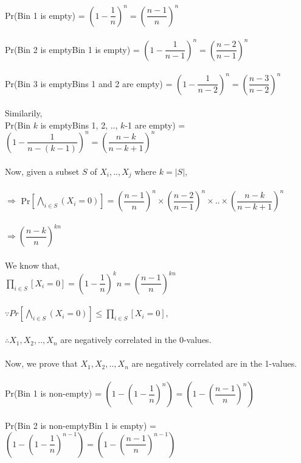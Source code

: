 \documentclass{article}
\begin{document}
Pr(Bin 1 is empty) = $\left(1-\dfrac{1}{n}\right)^n = \left(\dfrac{n-1}{n}\right)^n$\\
\\
Pr(Bin 2 is empty\textbar Bin 1 is empty) = $\left(1-\dfrac{1}{n-1}\right)^n = \left(\dfrac{n-2}{n-1}\right)^n$\\
\\
Pr(Bin 3 is empty\textbar Bins 1 and 2 are empty) = $\left(1-\dfrac{1}{n-2}\right)^n = \left(\dfrac{n-3}{n-2}\right)^n$\\
\\
Similarily,\\
Pr(Bin $k$ is empty\textbar Bins 1, 2, .., $k$-1 are empty) = $\left(1-\dfrac{1}{n-(k-1)}\right)^n = \left(\dfrac{n-k}{n-k+1}\right)^n$\\
\\
Now, given a subset $S$ of $X_{i}, .., X_{j}$ where $k = |S|$, \\
\\$\Rightarrow$ Pr$\left[\bigwedge\limits_{i \in S}(X_{i} = 0)\right] = \left(\dfrac{n-1}{n}\right)^n \times \left(\dfrac{n-2}{n-1}\right)^n 
\times .. \times \left(\dfrac{n-k}{n-k+1}\right)^n$\\
\\
$\Rightarrow \left(\dfrac{n-k}{n}\right)^{kn}$\\
\\
We know that, \\
$\prod\limits_{i \in S}\left[X_{i} = 0\right] = \left(1-\dfrac{1}{n}\right)^kn = \left(\dfrac{n-1}{n}\right)^{kn}$\\
\\
$\because Pr\left[\bigwedge\limits_{i \in S}(X_{i} = 0)\right] \le \prod\limits_{i \in S}\left[X_{i} = 0\right], $ \\
\\
$\therefore X_{1}, X_{2}, .., X_{n}$ are negatively correlated in the 0-values.\\
\\
Now, we prove that $X_{1}, X_{2}, .., X_{n}$ are negatively correlated are in the 1-values.\\
\\
Pr(Bin 1 is non-empty) = $\left(1-\left(1-\dfrac{1}{n}\right)^n\right) = \left(1-\left(\dfrac{n-1}{n}\right)^n\right)$\\
\\
Pr(Bin 2 is non-empty\textbar Bin 1 is empty) = $\left(1-\left(1-\dfrac{1}{n}\right)^{n-1}\right) = \left(1-\left(\dfrac{n-1}{n}\right)^{n-1}\right)$\\
\end{document}
